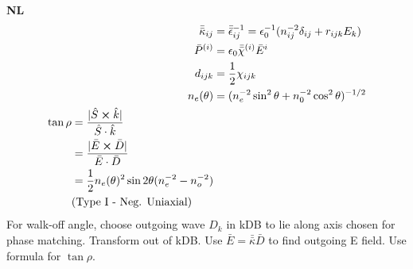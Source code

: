 \documentclass[12pt]{article}
\begin{document}
\begin{multicols}{3}
\textbf{NL}
\begin{align}
  \bar{\bar{\kappa}}_{ij} &= \bar{\bar{\epsilon}}_{ij}^{-1} = \epsilon_0^{-1} (n_{ij}^{-2} \delta_{ij} + r_{ijk} E_k)\\ %
  \bar{P}^{(i)} &= \epsilon_0 \bar{\bar{\chi}}^{(i)} \bar{E}^{i}\\
  d_{ijk} &= \frac{1}{2} \chi_{ijk}\\ %
  n_{e}(\theta) &= (n_e^{-2}\sin^2\theta + n_0^{-2}\cos^2\theta)^{-1/2}\\ %
  \begin{split}
    \tan\rho &{}= \frac{\lvert\hat{S} \cross \hat{k}\rvert}{\hat{S} \cdot \hat{k}}\\
    &= \frac{\lvert \bar{E} \cross \bar{D} \rvert}{\bar{E} \cdot \bar{D}}\\
    &= \frac{1}{2}n_e(\theta)^2\sin2\theta(n_e^{-2} - n_o^{-2} )\\
    &(\textrm{Type I - Neg. Uniaxial})
  \end{split}
\end{align}
For walk-off angle, choose outgoing wave $D_k$ in kDB to lie along axis chosen for phase matching.
Transform out of kDB. Use $\bar{E} = \bar{\bar{\kappa}} \bar{D}$ to find outgoing E field. Use
formula for $\tan\rho$.


\end{multicols}
\end{document}
